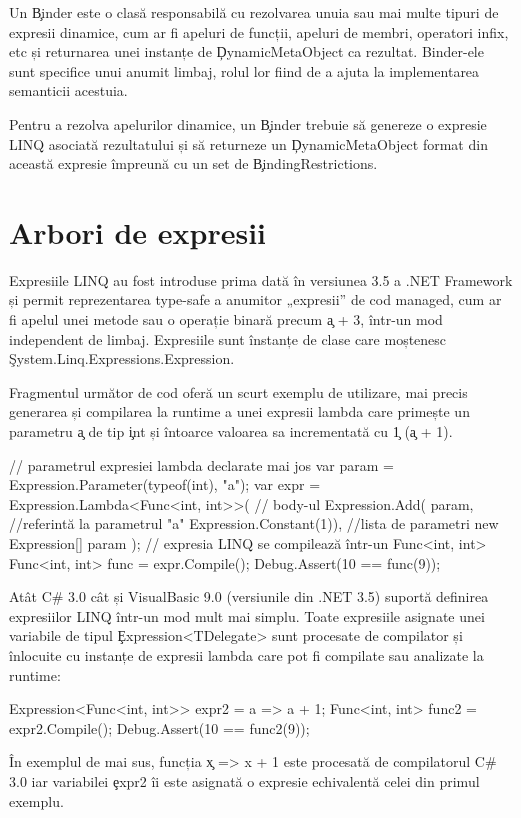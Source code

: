 \documentclass[12pt,a4paper]{memoir}
\begin{document}
Un \c{Binder} este o clasă responsabilă cu rezolvarea unuia sau mai multe tipuri de expresii dinamice, cum ar fi apeluri de funcții, apeluri de membri, operatori infix, etc și returnarea unei instanțe de \c{DynamicMetaObject} ca rezultat. Binder-ele sunt specifice unui anumit limbaj, rolul lor fiind de a ajuta la implementarea semanticii acestuia.

Pentru a rezolva apelurilor dinamice, un \c{Binder} trebuie să genereze o expresie LINQ asociată rezultatului și să returneze un \c{DynamicMetaObject} format din această expresie împreună cu un set de \c{BindingRestrictions}.

\section{Arbori de expresii}

Expresiile LINQ au fost introduse prima dată în versiunea 3.5 a .NET Framework\cite{expression_trees_35} și permit reprezentarea type-safe a anumitor „expresii” de cod managed, cum ar fi apelul unei metode sau o operație binară precum \c{a + 3}, într-un mod independent de limbaj. Expresiile sunt înstanțe de clase care moștenesc \c{System.Linq.Expressions.Expression}.

Fragmentul următor de cod oferă un scurt exemplu de utilizare, mai precis generarea și compilarea la runtime a unei expresii lambda care primește un parametru \c{a} de tip \c{int} și întoarce valoarea sa incrementată cu \c{1} (\c{a + 1}).
\begin{code}
// parametrul expresiei lambda declarate mai jos
var param = Expression.Parameter(typeof(int), "a");
var expr =
  Expression.Lambda<Func<int, int>>(
    // body-ul
    Expression.Add(
      param, //referintă la parametrul "a"
      Expression.Constant(1)),
    //lista de parametri
    new Expression[] { param });
// expresia LINQ se compilează într-un Func<int, int>
Func<int, int> func = expr.Compile();
Debug.Assert(10 == func(9));
\end{code}

Atât C\# 3.0 cât și VisualBasic 9.0 (versiunile din .NET 3.5) suportă definirea expresiilor LINQ într-un mod mult mai simplu. Toate expresiile asignate unei variabile de tipul \c{Expression<TDelegate>} sunt procesate de compilator și înlocuite cu instanțe de expresii lambda care pot fi compilate sau analizate la runtime:
\begin{code}
Expression<Func<int, int>> expr2 = a => a + 1;
Func<int, int> func2 = expr2.Compile();
Debug.Assert(10 == func2(9));
\end{code}
În exemplul de mai sus, funcția \c{x => x + 1} este procesată de compilatorul C\# 3.0 iar variabilei \c{expr2} îi este asignată o expresie echivalentă celei din primul exemplu.
\end{document}
